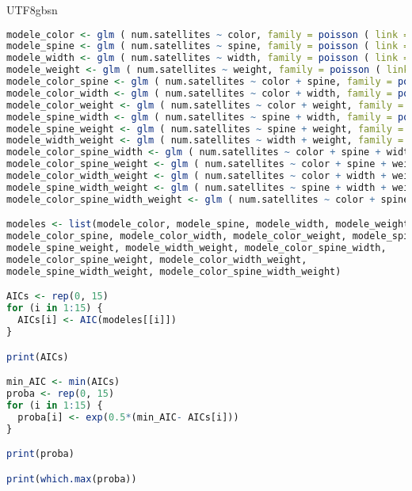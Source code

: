 \documentclass[../main.tex]{subfiles}
\begin{document}
\begin{CJK*}{UTF8}{gbsn}
\begin {lstlisting}[language=R]
modele_color <- glm ( num.satellites ~ color, family = poisson ( link = log ) ,data = hcrabs ) 
modele_spine <- glm ( num.satellites ~ spine, family = poisson ( link = log ) ,data = hcrabs )
modele_width <- glm ( num.satellites ~ width, family = poisson ( link = log ) ,data = hcrabs )
modele_weight <- glm ( num.satellites ~ weight, family = poisson ( link = log ) ,data = hcrabs )
modele_color_spine <- glm ( num.satellites ~ color + spine, family = poisson ( link = log ) ,data = hcrabs )
modele_color_width <- glm ( num.satellites ~ color + width, family = poisson ( link = log ) ,data = hcrabs )
modele_color_weight <- glm ( num.satellites ~ color + weight, family = poisson ( link = log ) ,data = hcrabs )
modele_spine_width <- glm ( num.satellites ~ spine + width, family = poisson ( link = log ) ,data = hcrabs )
modele_spine_weight <- glm ( num.satellites ~ spine + weight, family = poisson ( link = log ) ,data = hcrabs )
modele_width_weight <- glm ( num.satellites ~ width + weight, family = poisson ( link = log ) ,data = hcrabs )
modele_color_spine_width <- glm ( num.satellites ~ color + spine + width, family = poisson ( link = log ) ,data = hcrabs )
modele_color_spine_weight <- glm ( num.satellites ~ color + spine + weight, family = poisson ( link = log ) ,data = hcrabs )
modele_color_width_weight <- glm ( num.satellites ~ color + width + weight, family = poisson ( link = log ) ,data = hcrabs )
modele_spine_width_weight <- glm ( num.satellites ~ spine + width + weight, family = poisson ( link = log ) ,data = hcrabs )
modele_color_spine_width_weight <- glm ( num.satellites ~ color + spine + width + weight, family = poisson ( link = log ) ,data = hcrabs )

modeles <- list(modele_color, modele_spine, modele_width, modele_weight, 
modele_color_spine, modele_color_width, modele_color_weight, modele_spine_width, 
modele_spine_weight, modele_width_weight, modele_color_spine_width, 
modele_color_spine_weight, modele_color_width_weight, 
modele_spine_width_weight, modele_color_spine_width_weight)

AICs <- rep(0, 15)
for (i in 1:15) {
  AICs[i] <- AIC(modeles[[i]])
}

print(AICs)

min_AIC <- min(AICs)
proba <- rep(0, 15)
for (i in 1:15) {
  proba[i] <- exp(0.5*(min_AIC- AICs[i]))
}

print(proba)

print(which.max(proba))


\end{lstlisting}
\end{CJK*}
\end{document}
